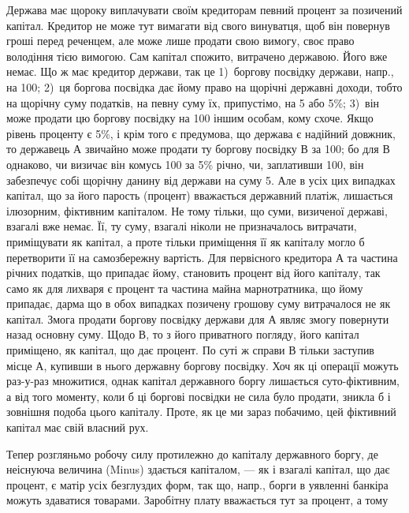 Держава має щороку виплачувати своїм кредиторам певний процент за
позичений капітал. Кредитор не може тут вимагати від свого винуватця, щоб він
повернув гроші перед реченцем, але може лише продати свою вимогу, своє
право володіння тією вимогою. Сам капітал спожито, витрачено державою. Його
вже немає. Що ж має кредитор держави, так це 1)~боргову посвідку держави,
напр., на 100; 2)~ця боргова посвідка дає йому право на щорічні
державні доходи, тобто на щорічну суму податків, на певну суму їх, припустімо,
на 5 або 5\%; 3)~він може продати цю боргову посвідку на 100
іншим особам, кому схоче. Якщо рівень проценту є 5\%, і крім того є предумова,
що держава є надійний довжник, то державець $А$ звичайно може продати ту боргову
посвідку $В$ за 100; бо для $В$ однаково, чи визичає він комусь 100
за 5\% річно, чи, заплативши 100, він забезпечує собі щорічну данину
від держави на суму 5. Але в усіх цих випадках капітал, що за його
парость (процент) вважається державний платіж, лишається ілюзорним, фіктивним
капіталом. Не тому тільки, що суми, визиченої державі, взагалі вже немає.
Її, ту суму, взагалі ніколи не призначалось витрачати, приміщувати як капітал,
а проте тільки приміщення її як капіталу могло б перетворити її на самозбережну
вартість. Для первісного кредитора $А$ та частина річних податків, що припадає
йому, становить процент від його капіталу, так само як для лихваря є процент
та частина майна марнотратника, що йому припадає, дарма що в обох випадках
позичену грошову суму витрачалося не як капітал. Змога продати боргову
посвідку держави для $А$ являє змогу повернути назад основну суму. Щодо $В$,
то з його приватного погляду, його капітал приміщено, як капітал, що дає
процент. По суті ж справи $В$ тільки заступив місце $А$, купивши в нього
державну боргову посвідку. Хоч як ці операції можуть раз-у-раз множитися,
однак капітал державного боргу лишається суто-фіктивним, а від того моменту,
коли б ці боргові посвідки не сила було продати, зникла б і зовнішня подоба
цього капіталу. Проте, як це ми зараз побачимо, цей фіктивний капітал
має свій власний рух.

Тепер розгляньмо робочу силу протилежно до капіталу державного боргу,
де неіснуюча величина (Minus) здається капіталом, — як і взагалі капітал, що дає
процент, є матір усіх безглуздих форм, так що, напр., борги в уявленні банкіра
можуть здаватися товарами. Заробітну плату вважається тут за процент, а тому
\parbreak{}  %
